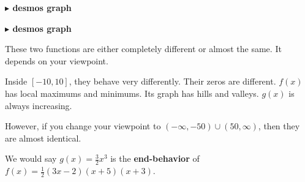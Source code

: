 \documentclass{ximera}
\begin{document}
\begin{example}
\begin{image}
\end{image}



\begin{onlineOnly}
\textbf{\textcolor{blue!55!black}{$\blacktriangleright$ desmos graph}} 
\begin{center}
\end{center}
\end{onlineOnly}




















\begin{onlineOnly}
\textbf{\textcolor{blue!55!black}{$\blacktriangleright$ desmos graph}} 
\begin{center}
\end{center}
\end{onlineOnly}









These two functions are either completely different or almost the same.  It depends on your viewpoint.

Inside $[-10, 10]$, they behave very differently. Their zeros are different.  $f(x)$ has local maximums and minimums.  Its graph has hills and valleys.  $g(x)$ is always increasing.

However, if you change your viewpoint to $(-\infty, -50) \cup (50, \infty)$, then they are almost identical.


We would say $g(x) = \frac{3}{2}x^3$ is the \textbf{end-behavior} of $f(x) = \frac{1}{2}(3x-2)(x+5)(x+3)$.






\end{example}
\end{document}
